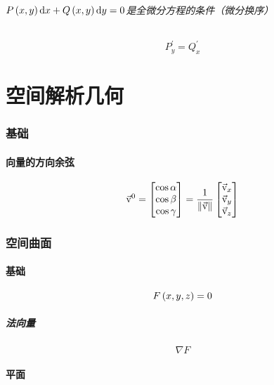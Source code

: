 \documentclass{article}
\begin{document}
\paragraph{$P\left(x,y\right)\mathrm d x+Q\left(x,y\right)\mathrm d y=0$是全微分方程的条件（微分换序）}

\[P_y^\prime=Q_x^\prime\]

\part{空间解析几何}

\section{基础}

\subsection{向量的方向余弦}

\[\vec{\mathrm v}^0=
    \begin{bmatrix}
        \cos\alpha \\
        \cos\beta  \\
        \cos\gamma
    \end{bmatrix}=
    \frac1{\left\Vert\vec{\mathrm v}\right\Vert}
    \begin{bmatrix}\vec{\mathrm v}_x\\\vec{\mathrm v}_y\\\vec{\mathrm v}_z\end{bmatrix}\]

\section{空间曲面}

\subsection{基础}

\begin{definition}[]
    \[F\left(x,y,z\right)=0\]
\end{definition}

\subsubsection{法向量}

\[\nabla F\]

\subsection{平面}
\end{document}

